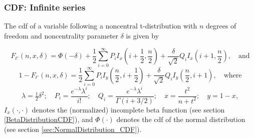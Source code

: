 \subsubsection{CDF: Infinite series}
The cdf of a variable following a noncentral  t-distribution with $n$ degrees of freedom and noncentrality parameter $\delta$ is given by \citep{Benton_2003, boost_math}

\begin{equation}
	F_{t'}\left(n,x, \delta\right) = \Phi(-\delta) + \frac{1}{2} \sum_{i=0}^{\infty} P_i I_x\left(i+ \frac{1}{2} , \frac{n}{2}\right) + \frac{\delta}{\sqrt{2}} Q_i I_x\left(i+1, \frac{n}{2}\right), \quad \text{and}
\end{equation} 
\begin{equation}
	1-F_{t'}\left(n,x, \delta\right) = \frac{1}{2} \sum_{i=0}^{\infty} P_i I_y\left( \frac{n}{2}, i+ \frac{1}{2} \right) + \frac{\delta}{\sqrt{2}} Q_i I_y\left(\frac{n}{2},i+1\right), \quad \text{where}
\end{equation}
\begin{equation}\label{eq:NonCentralTSeriesCoeff}
	\lambda = \tfrac{1}{2}\delta^2; \quad P_i =  \frac{e^{-\lambda} \lambda^i}{i!} ; \quad Q_i = \frac{e^{-\lambda} \lambda^i}{\Gamma(i+3/2)};  \quad x=\frac{t^2}{n+t^2};  \quad y=1-x,
\end{equation}
$I_x(\cdot,\cdot)$ denotes the (normalized) incomplete beta function (see section \ref{BetaDistributionCDF}), and $\Phi(\cdot)$ denotes the cdf of the normal distribution (see section \ref{sec:NormalDistribution_CDF}).



